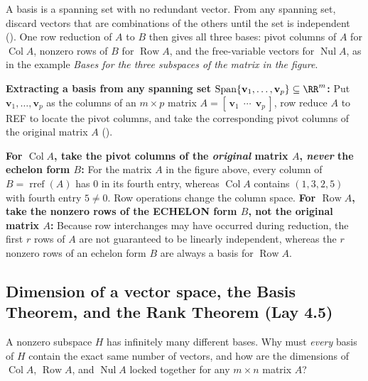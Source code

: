 \documentclass[10pt]{scrartcl}
\newcommand{\vv}[1]{\mathbf{#1}}
\DeclareMathOperator{\spn}{Span}\DeclareMathOperator{\Nul}{Nul}\DeclareMathOperator{\Col}{Col}\DeclareMathOperator{\Row}{Row}\DeclareMathOperator{\nullity}{nullity}
\begin{document}
\revisit
A basis is a spanning set with no redundant vector. From any spanning set, discard vectors that are combinations of the others until the set is independent (). One row reduction of $A$ to $B$ then gives all three bases: pivot columns of $A$ for $\Col A$, nonzero rows of $B$ for $\Row A$, and the free-variable vectors for $\Nul A$, as in the example \emph{Bases for the three subspaces of the matrix in the figure}.

\begin{shortcuts}
  \ii \textbf{Extracting a basis from any spanning set $\spn\{\vv v_1,\dots,\vv v_p\}\subseteq\RR^m$:} Put $\vv v_1,\dots,\vv v_p$ as the columns of an $m\times p$ matrix $A=[\,\vv v_1\ \ \cdots\ \ \vv v_p\,]$, row reduce $A$ to REF to locate the pivot columns, and take the corresponding pivot columns of the original matrix $A$ ().
\end{shortcuts}

\begin{trapbox}
  \ii \textbf{For $\Col A$, take the pivot columns of the \emph{original} matrix $A$, \emph{never} the echelon form $B$:} For the matrix $A$ in the figure above, every column of $B=\operatorname{rref}(A)$ has $0$ in its fourth entry, whereas $\Col A$ contains $(1,3,2,5)$ with fourth entry $5\ne 0$. Row operations change the column space.
  \ii \textbf{For $\Row A$, take the nonzero rows of the ECHELON form $B$, not the original matrix $A$:} Because row interchanges may have occurred during reduction, the first $r$ rows of $A$ are not guaranteed to be linearly independent, whereas the $r$ nonzero rows of an echelon form $B$ are always a basis for $\Row A$.
\end{trapbox}

\subsection{Dimension of a vector space, the Basis Theorem, and the Rank Theorem (Lay 4.5)}

\begin{qbox}
  A nonzero subspace $H$ has infinitely many different bases. Why must \emph{every} basis of $H$ contain the exact same number of vectors, and how are the dimensions of $\Col A$, $\Row A$, and $\Nul A$ locked together for any $m\times n$ matrix $A$?
\end{qbox}
\end{document}
